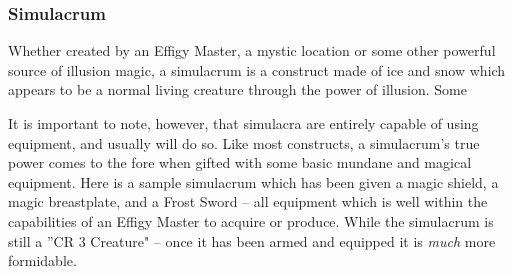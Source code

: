% 
\subsubsection{Simulacrum}
Whether created by an Effigy Master, a mystic location or some other powerful source of illusion magic, a simulacrum is a construct made of ice and snow which appears to be a normal living creature through the power of illusion. Some 

\noindent{}

It is important to note, however, that simulacra are entirely capable of using equipment, and usually will do so. Like most constructs, a simulacrum's true power comes to the fore when gifted with some basic mundane and magical equipment. Here is a sample simulacrum which has been given a magic shield, a magic breastplate, and a Frost Sword -- all equipment which is well within the capabilities of an Effigy Master to acquire or produce. While the simulacrum is still a ''CR 3 Creature" -- once it has been armed and equipped it is \textit{much} more formidable.

